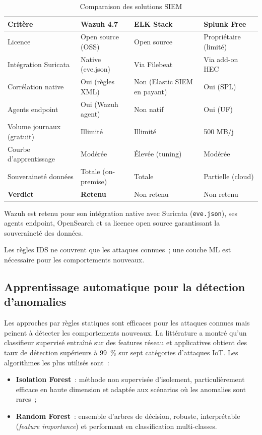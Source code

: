 \begin{table}[!htbp]
\centering
\caption{Comparaison des solutions SIEM}
\label{tab:siem-compare}
\small
\begin{tabularx}{\linewidth}{|l|X|X|X|}
\hline
\textbf{Critère} & \textbf{Wazuh 4.7} & \textbf{ELK Stack} & \textbf{Splunk Free} \\
\hline
Licence              & Open source (OSS)   & Open source    & Propriétaire (limité) \\ \hline
Intégration Suricata & Native (eve.json)   & Via Filebeat    & Via add-on HEC \\ \hline
Corrélation native   & Oui (règles XML)    & Non (Elastic SIEM en payant) & Oui (SPL) \\ \hline
Agents endpoint      & Oui (Wazuh agent)   & Non natif       & Oui (UF) \\ \hline
Volume journaux (gratuit) & Illimité       & Illimité        & 500 MB/j \\ \hline
Courbe d'apprentissage & Modérée          & Élevée (tuning) & Modérée \\ \hline
Souveraineté données & Totale (on-premise) & Totale          & Partielle (cloud) \\ \hline
\textbf{Verdict}     & \textbf{Retenu}     & Non retenu      & Non retenu \\ \hline
\end{tabularx}
\end{table}

Wazuh est retenu pour son intégration native avec Suricata (\texttt{eve.json}), ses agents endpoint, OpenSearch et sa licence open source garantissant la souveraineté des données.

Les règles IDS ne couvrent que les attaques connues~; une couche ML est nécessaire pour les comportements nouveaux.

\subsection{Apprentissage automatique pour la détection d'anomalies}
\label{sec:ea-ml}

Les approches par règles statiques sont efficaces pour les attaques connues mais peinent à détecter les comportements nouveaux. La littérature a montré qu'un classifieur supervisé entraîné sur des features réseau et applicatives obtient des taux de détection supérieurs à 99~\% sur sept catégories d'attaques IoT. Les algorithmes les plus utilisés sont~:

\begin{itemize}[leftmargin=*]
  \item \textbf{Isolation Forest}~: méthode non supervisée d'isolement, particulièrement efficace en haute dimension et adaptée aux scénarios où les anomalies sont rares~;
  \item \textbf{Random Forest}~: ensemble d'arbres de décision, robuste, interprétable (\emph{feature importance}) et performant en classification multi-classes.
\end{itemize}

